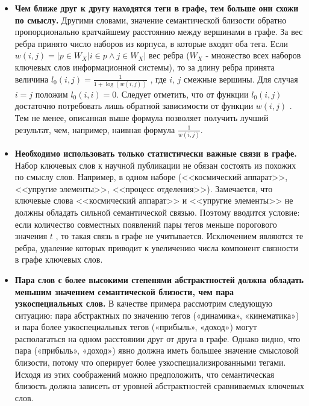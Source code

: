 \begin{itemize}
    \item \textbf{Чем ближе друг к другу находятся теги в графе, тем больше они схожи по смыслу.} Другими словами, значение семантической близости обратно пропорционально кратчайшему расстоянию между вершинами в графе. За вес ребра принято число наборов из корпуса, в которые входят оба тега. Если $w(i, j) = |{p \in W_X | i \in p \wedge j \in W_X}|$ ­ вес ребра ($W_X$ - множество всех наборов ключевых слов информационной системы), то за длину ребра принята величина $l_0(i, j) = \frac{1}{1+\log(w(i,j))}$ , где $i$, $j$ ­ смежные вершины. Для случая $i = j$ положим $l_0(i, i) = 0$. Следует отметить, что от функции $l_0(i, j)$ достаточно потребовать лишь обратной зависимости от функции $w(i, j)$ . Тем не менее, описанная выше формула позволяет получить лучший результат, чем, например, наивная формула $\frac{1}{w(i,j)}$.
    \item \textbf{Необходимо использовать только статистически важные связи в графе.} Набор ключевых слов к научной публикации не обязан состоять из похожих по смыслу слов. Например, в одном наборе (<<космический аппарат>>, <<упругие элементы>>, <<процесс отделения>>). Замечается, что ключевые слова <<космический аппарат>> и <<упругие элементы>> не должны обладать сильной семантической связью. Поэтому вводится условие: если количество совместных появлений пары тегов меньше порогового значения $t$ , то такая связь в графе не учитывается. Исключением являются те ребра, удаление которых приводит к увеличению числа компонент связности в графе ключевых слов.
    \item \textbf{Пара слов с более высокими степенями абстрактностей должна обладать меньшим значением семантической близости, чем пара узкоспециальных слов.} В качестве примера рассмотрим следующую ситуацию: пара абстрактных по значению тегов («динамика», «кинематика») и пара более узкоспециальных тегов («прибыль», «доход») могут располагаться на одном расстоянии друг от друга в графе. Однако видно, что пара («прибыль», «доход») явно должна иметь большее значение смысловой близости, потому что оперирует более узкоспециализированными тегами. Исходя из этих соображений можно предположить, что семантическая близость должна зависеть от уровней абстрактностей сравниваемых ключевых слов.

\end{itemize}
